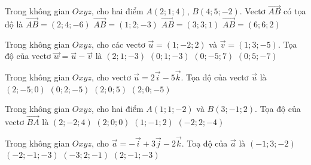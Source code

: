 \begin{ex}%
	Trong không gian $Oxyz$, cho hai điểm $A(2;1;4)$, $B(4;5;-2)$. Vectơ $\overrightarrow{AB}$ có tọa độ là
	\choice
	{\True $\overrightarrow{AB}=(2;4;-6)$}
	{$\overrightarrow{AB}=(1;2;-3)$}
	{$\overrightarrow{AB}=(3;3;1)$}
	{$\overrightarrow{AB}=(6;6;2)$}
\end{ex}

\begin{ex}%
	Trong không gian $Oxyz$, cho các vectơ $\overrightarrow{u}=(1;-2; 2)$ và $\overrightarrow{v}=(1; 3;-5)$. Tọa độ của vectơ $\overrightarrow{w}=\overrightarrow{u}-\overrightarrow{v}$ là
	\choice
	{$(2; 1;-3)$}
	{$(0; 1;-3)$}
	{\True $(0;-5; 7)$}
	{$(0; 5;-7)$}
\end{ex}

\begin{ex}%
	Trong không gian $Oxyz$, cho vectơ $\overrightarrow{u} = 2\overrightarrow{i}-5\overrightarrow{k}$. Tọa độ của vectơ $\overrightarrow{u}$ là
	\choice
	{$(2;-5;0)$}
	{$(0;2;-5)$}
	{$(2;0;5)$}
	{\True $(2;0;-5)$}
\end{ex}

\begin{ex}%
	Trong không gian $Oxyz$, cho hai điểm $A(1;1;-2)$ và $B(3;-1;2)$. Tọa độ của vectơ $\overrightarrow{BA}$ là
	\choice
	{$(2;-2;4)$}
	{$(2;0;0)$}
	{$(1;-1;2)$}
	{\True $(-2;2;-4)$}
\end{ex}

\begin{ex}%
	Trong không gian $Oxyz$, cho $\overrightarrow{a}=-\overrightarrow{i}+3\overrightarrow{j}-2\overrightarrow{k}$. Toạ độ của $\overrightarrow{a}$ là
	\choice
	{\True $(-1;3;-2)$}
	{$(-2;-1;-3)$}
	{$(-3;2;-1)$}
	{$(2;-1;-3)$}
\end{ex}

